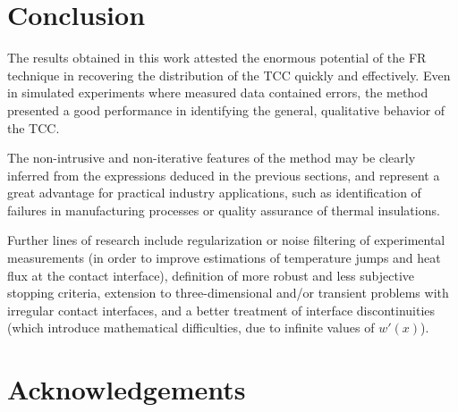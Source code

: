 \documentclass[12pt]{CHT-20}
\begin{document}

\section*{Conclusion}

The results obtained in this work attested the enormous potential of the FR technique in recovering the distribution of the TCC quickly and effectively. Even in simulated experiments where measured data contained errors, the method presented a good performance in identifying the general, qualitative behavior of the TCC.

The non-intrusive and non-iterative features of the method may be clearly inferred from the expressions deduced in the previous sections, and represent a great advantage for practical industry applications, such as identification of failures in manufacturing processes or quality assurance of thermal insulations.

Further lines of research include regularization or noise filtering of experimental measurements (in order to improve estimations of temperature jumps and heat flux at the contact interface), definition of more robust and less subjective stopping criteria, extension to three-dimensional and/or transient problems with irregular contact interfaces, and a better treatment of interface discontinuities (which introduce mathematical difficulties, due to infinite values of $w'(x)$).

\section*{Acknowledgements}
\end{document}

